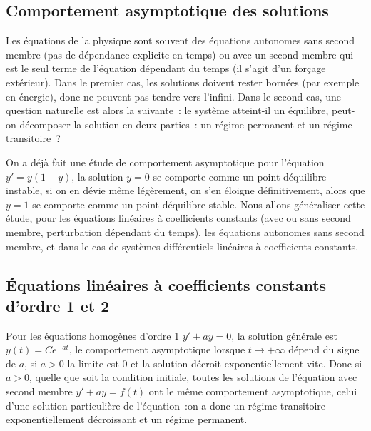 \documentclass[a4paper,11pt]{book}
\begin{document}
\begin{giacjshere}
\section{Comportement asymptotique des solutions}
Les \'equations de la physique sont souvent des \'equations
autonomes sans second membre (pas de d\'ependance explicite en temps) 
ou avec un second membre
qui est le seul terme de l'\'equation d\'ependant du temps (il
s'agit d'un for\c{c}age ext\'erieur). Dans le premier cas,
les solutions doivent rester born\'ees (par exemple en \'energie), donc
ne peuvent pas tendre vers l'infini. Dans le second cas,
une question naturelle
est alors la suivante~: le syst\`eme atteint-il un \'equilibre,
peut-on d\'ecomposer la solution en deux parties~: un r\'egime
permanent et un r\'egime transitoire~?

On a d\'ej\`a fait une \'etude de comportement asymptotique
pour l'\'equation $y'=y(1-y)$, la solution $y=0$ se comporte
comme un point d\'equilibre instable, si on en d\'evie m\^eme
l\'eg\`erement, on s'en \'eloigne d\'efinitivement, alors que $y=1$ se
comporte comme un point d\'equilibre stable.
Nous allons g\'en\'eraliser cette \'etude, pour les \'equations
lin\'eaires \`a coefficients constants (avec ou sans second membre,
perturbation d\'ependant du temps),
les \'equations autonomes sans second membre,
et dans le cas de syst\`emes diff\'erentiels lin\'eaires \`a
coefficients constants.

\subsection{\'Equations lin\'eaires \`a coefficients constants 
d'ordre 1 et 2}
Pour les \'equations homog\`enes d'ordre 1 $y'+ay=0$, 
la solution g\'en\'erale est $y(t)=Ce^{-at}$, le comportement
asymptotique lorsque $t \rightarrow +\infty$ d\'epend du signe
de $a$, si $a>0$ la limite est 0 et la solution d\'ecroit
exponentiellement vite. Donc si $a>0$, quelle
que soit la condition initiale, toutes les solutions de 
l'\'equation avec second membre $y'+ay=f(t)$ ont
le m\^eme comportement asymptotique, celui
d'une solution particuli\`ere de l'\'equation~:on a donc
un r\'egime transitoire exponentiellement d\'ecroissant
et un r\'egime permanent.


\end{giacjshere}
\end{document}
